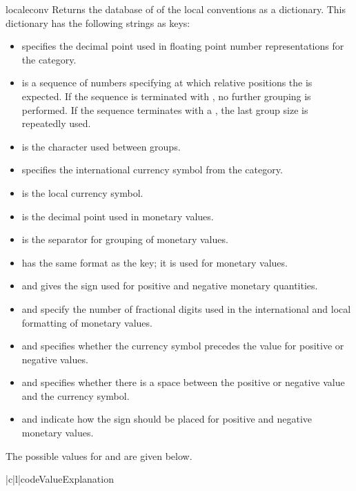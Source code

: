 \begin{funcdesc}{localeconv}{}
Returns the database of of the local conventions as a dictionary. This
dictionary has the following strings as keys:
\begin{itemize}
\item {} specifies the decimal point used in
floating point number representations for the 
category.
\item {} is a sequence of numbers specifying at which
relative positions the  is expected. If the
sequence is terminated with , no further
grouping is performed. If the sequence terminates with a , the last
group size is repeatedly used.
\item {} is the character used between groups.
\item {} specifies the international currency
symbol from the  category.
\item {} is the local currency symbol.
\item {} is the decimal point used in monetary
values.
\item {} is the separator for grouping of
monetary values.
\item {} has the same format as the 
key; it is used for monetary values.
\item {} and  gives the sign
used for positive and negative monetary quantities.
\item {} and  specify the number
of fractional digits used in the international and local formatting
of monetary values.
\item {} and  specifies whether
the currency symbol precedes the value for positive or negative
values.
\item {} and  specifies
whether there is a space between the positive or negative value and
the currency symbol.
\item {} and  indicate how the
sign should be placed for positive and negative monetary values. 
\end{itemize}

The possible values for  and 
are given below.

\begin{tableii}{|c|l|}{code}{Value}{Explanation}
\end{tableii}
\end{funcdesc}


